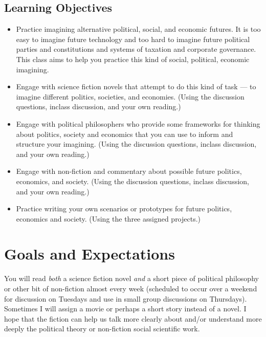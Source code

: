 \documentclass[letterpaper]{inzane_syllabus} %
\begin{document}
\subsection{Learning Objectives}

\begin{itemize}
    \item Practice imagining alternative political, social, and economic futures. It is too easy to imagine future technology and too hard to imagine future political parties and constitutions and systems of taxation and corporate governance. This class aims to help you practice this kind of social, political, economic imagining.
    \item Engage with science fiction novels that attempt to do this kind of task --- to imagine different politics, societies, and economies. (Using the discussion questions, inclass discussion, and your own reading.)
    \item Engage with political philosophers who provide some frameworks for thinking about politics, society and economics that you can use to inform and structure your imagining.  (Using the discussion questions, inclass discussion, and your own reading.)
    \item Engage with non-fiction and commentary about possible future politics, economics, and society.  (Using the discussion questions, inclass discussion, and your own reading.)
    \item Practice writing your own scenarios or prototypes for future politics, economics and society. (Using the three assigned projects.)
\end{itemize}


\newpage %


\makeFullPage

\section{Goals and Expectations}

You will read \emph{both} a science fiction novel \emph{and} a short piece of
political philosophy or other bit of non-fiction almost every week (scheduled
to occur over a weekend for discussion on Tuesdays and use in small group
discussions on Thursdays). Sometimes I will assign a movie or perhaps a short
story instead of a novel.  I hope that the fiction can help us talk more
clearly about and/or understand more deeply the political theory or non-fiction
social scientific work.
\end{document}

